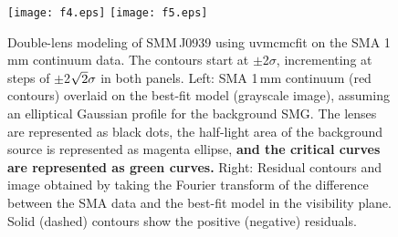 \documentclass[iop, revtex4]{emulateapj}
\begin{document}

\begin{figure}[!tbpH]
\centering
\texttt{[image: f4.eps]}
\texttt{[image: f5.eps]}
\caption{Double-lens modeling of SMM\,J0939 using {\sc uvmcmcfit} on the SMA 1\,mm continuum data.
The contours start at $\pm$2$\sigma$, incrementing at
steps of $\pm$2$\sqrt{\rm 2}\sigma$ in both panels. Left: SMA 1\,mm continuum (red contours) overlaid on the best-fit model (grayscale image), assuming an elliptical Gaussian profile for the background SMG. The lenses are represented as black dots, the half-light area of the background source is represented as magenta ellipse, {\bf and the critical curves are represented as green curves.}
Right: Residual contours and image obtained by taking the Fourier transform of the difference between the SMA data and the best-fit model in the visibility plane. Solid (dashed) contours show the positive (negative) residuals.\label{fig:lens}}
\end{figure}
\end{document}
